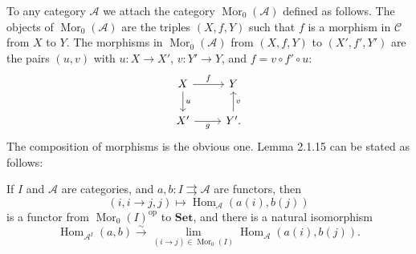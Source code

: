 \documentclass[12pt]{article}%
\theoremstyle{remark}
\theoremstyle{definition}
\newcommand{\A}{\mathcal A}
\newcommand{\C}{\mathcal C}
\newcommand{\Set}{\mathbf{Set}}%
\newcommand{\parar}{\rightrightarrows}
\newcommand{\xr}{\xrightarrow}
\DeclareMathOperator{\Hom}{Hom}%
\DeclareMathOperator{\Mor}{Mor}
\DeclareMathOperator{\op}{op}
\begin{document}
To any category $\A$ we attach the category $\Mor_0(\A)$ defined as follows. The objects of $\Mor_0(\A)$ are the triples $(X,f,Y)$ such that $f$ is a morphism in $\C$ from $X$ to $Y$. The morphisms in $\Mor_0(\A)$ from $(X,f,Y)$ to $(X',f',Y')$ are the pairs $(u,v)$ with $u:X\to X'$, $v:Y'\to Y$, and $f=v\circ f'\circ u$:
$$
\begin{tikzcd}
X\ar{d}{u}\ar{r}{f}&Y\\ 
X'\ar{r}[swap]{g}&Y'\ar{u}[swap]{v}.
\end{tikzcd}
$$ 
The composition of morphisms is the obvious one. Lemma 2.1.15 can be stated as follows: 

If $I$ and $\A$ are categories, and $a,b:I\parar\A$ are functors, then 
$$
(i,i\to j,j)\mapsto\Hom_\A(a(i),b(j))
$$ 
is a functor from $\Mor_0(I)^{\op}$ to $\Set$, and there is a natural isomorphism 
%
\begin{equation}\label{2115} 
\Hom_{\A^I}(a,b)\xr\sim\lim_{(i\to j)\in\Mor_0(I)}\Hom_\A(a(i),b(j)).
\end{equation}
%
\end{document}

